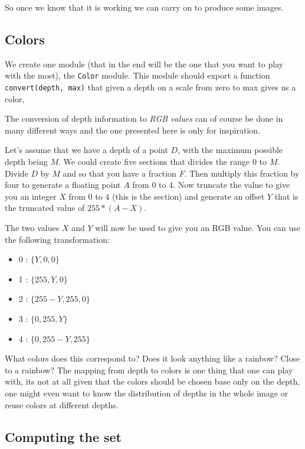 \documentclass[a4paper,11pt]{article}
\begin{document}
So once we know that it is working we can carry on to produce some images.


\subsection{Colors}
We create one module (that in the end will be the one that you want to
play with the most), the {\tt Color} module. This module should export
a function {\tt convert(depth, max)} that given a depth on a scale
from zero to max gives us a color,

The conversion of depth information to {\em RGB values} can of course
be done in many different ways and the one presented here is only for
inspiration.

Let's assume that we have a depth of a point $D$, with the maximum
possible depth being $M$. We could create five sections that divides
the range $0$ to $M$. Divide $D$ by $M$ and so that you have a
fraction $F$. Then multiply this fraction by four to generate a
floating point $A$ from $0$ to $4$. Now truncate the value to give you
an integer $X$ from $0$ to $4$ (this is the section) and generate an
offset $Y$ that is the truncated value of $255*(A-X)$.

The two values $X$ and $Y$ will now be used to give you an RGB
value. You can use the following transformation:

\begin {itemize}
\item 0 : $\lbrace Y, 0, 0 \rbrace$
\item 1 : $\lbrace 255, Y, 0 \rbrace$
\item 2 : $\lbrace 255-Y, 255, 0 \rbrace$
\item 3 : $\lbrace 0, 255, Y \rbrace$
\item 4 : $\lbrace 0, 255-Y, 255 \rbrace$
\end{itemize}

What colors does this correspond to? Does it look anything like a
rainbow? Close to a rainbow? The mapping from depth to colors is one
thing that one can play with, its not at all given that the colors
should be chosen base only on the depth, one might even want to know
the distribution of depths in the whole image or reuse colors at
different depths.


\subsection{Computing the set}
\end{document}

